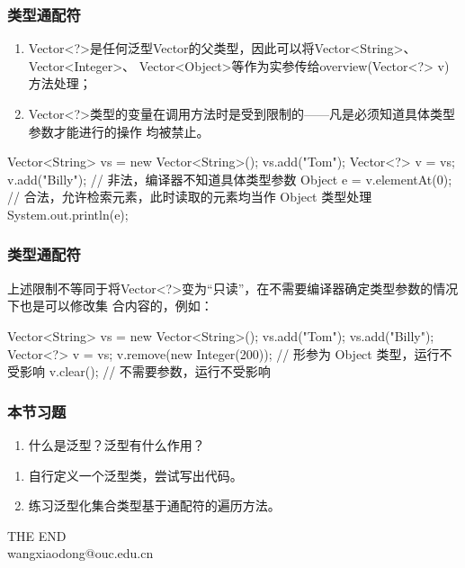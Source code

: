 \begin{frame}[fragile] %
\frametitle{类型通配符}

\begin{enumerate}
\item Vector<?>是任何泛型Vector的父类型，因此可以将Vector<String>、Vector<Integer>、
  Vector<Object>等作为实参传给overview(Vector<?> v)方法处理；
\item Vector<?>类型的变量在调用方法时是受到限制的——凡是必须知道具体类型参数才能进行的操作
  均被禁止。
\end{enumerate}

\begin{javaCode}
Vector<String> vs = new Vector<String>();
vs.add("Tom");
Vector<?> v = vs;
v.add("Billy");  // 非法，编译器不知道具体类型参数
Object e = v.elementAt(0); // 合法，允许检索元素，此时读取的元素均当作 Object 类型处理
System.out.println(e);
\end{javaCode}
\end{frame}

\begin{frame}[fragile] %
\frametitle{类型通配符}

上述限制不等同于将Vector<?>变为“只读”，在不需要编译器确定类型参数的情况下也是可以修改集
合内容的，例如：
\begin{javaCode}
Vector<String> vs = new Vector<String>();
vs.add("Tom");
vs.add("Billy");
Vector<?> v = vs;
v.remove(new Integer(200));  // 形参为 Object 类型，运行不受影响
v.clear(); // 不需要参数，运行不受影响
\end{javaCode}
\end{frame}

\begin{frame}[fragile]
  \frametitle{本节习题}

  \begin{enumerate}
  \item 什么是泛型？泛型有什么作用？
  \end{enumerate}

  \begin{enumerate}
  \item 自行定义一个泛型类，尝试写出代码。
  \item 练习泛型化集合类型基于通配符的遍历方法。
  \end{enumerate}

\end{frame}

\begin{frame}[focus]
\centering
{\Huge {THE END}} \\
\vspace{5mm}
{\Large wangxiaodong@ouc.edu.cn} \\
\end{frame}
